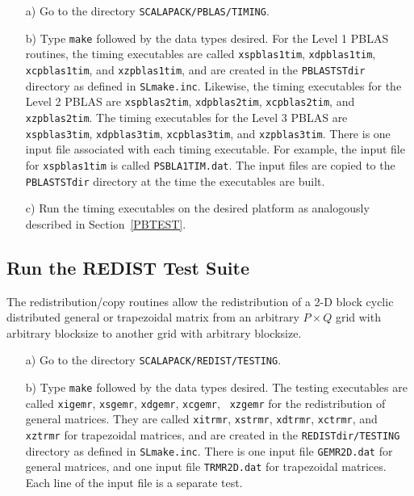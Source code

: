 \documentclass[11pt]{report}
\begin{document}
\begin{itemize}
\item[a)]
Go to the directory {\tt SCALAPACK/PBLAS/TIMING}.

\item[b)]
Type {\tt make} followed by the data types desired.  For the Level 1
PBLAS routines, the timing executables are called {\tt xspblas1tim},
{\tt xdpblas1tim}, {\tt xcpblas1tim}, and {\tt xzpblas1tim}, and are
created in the
{\tt PBLASTSTdir} directory as defined in {\tt SLmake.inc}.  Likewise,
the timing executables for the Level 2 PBLAS are {\tt xspblas2tim},
{\tt xdpblas2tim}, {\tt xcpblas2tim}, and {\tt xzpblas2tim}.  The
timing executables for the Level 3 PBLAS are {\tt xspblas3tim},
{\tt xdpblas3tim}, {\tt xcpblas3tim}, and {\tt xzpblas3tim}. There is
one input
file associated with each timing executable.  For example, the input
file for {\tt xspblas1tim} is called {\tt PSBLA1TIM.dat}.  The input files
are copied to the {\tt PBLASTSTdir} directory at the time the
executables are built.

\item[c)] Run the timing executables on the desired platform as
analogously described in Section~\ref{PBTEST}.
\end{itemize}

\subsection{Run the REDIST Test Suite}
\label{RDTEST}
The redistribution/copy routines allow the
redistribution of a 2-D block cyclic distributed general or trapezoidal
matrix from an arbitrary $P \times Q$ grid with arbitrary blocksize to
another grid with arbitrary
blocksize.

\begin{itemize}
\item[a)]
Go to the directory {\tt SCALAPACK/REDIST/TESTING}.

\item[b)]
Type {\tt make} followed by the data types desired.  The testing executables
are called {\tt xigemr}, {\tt xsgemr}, {\tt xdgemr}, {\tt xcgemr}, {\tt
xzgemr} for the redistribution of general matrices.  They are called
{\tt xitrmr}, {\tt xstrmr}, {\tt xdtrmr}, {\tt xctrmr}, and {\tt xztrmr}
for trapezoidal
matrices, and are created in the {\tt REDISTdir/TESTING} directory as
defined in {\tt SLmake.inc}.
There is one input file {\tt GEMR2D.dat} for general matrices, and one
input file {\tt TRMR2D.dat} for trapezoidal matrices.
Each line of the input file is a separate test.
\end{itemize}
\end{document}
